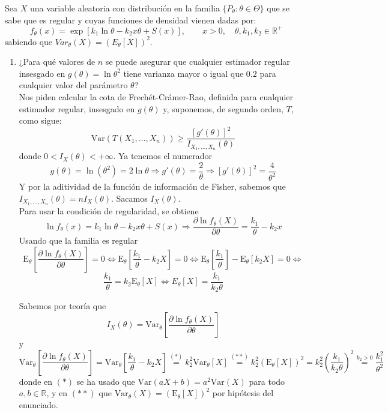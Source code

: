 \documentclass[12pt]{article}
\newcommand{\E}{\mathrm{E}}
\newcommand{\V}{\mathrm{Var}}
\newcommand{\R}{\mathbb{R}}
\begin{document}
    \begin{ejercicio}[2 puntos]
        Sea $X$ una variable aleatoria con distribución en la familia $\{P_\theta:\theta \in \Theta\}$ que se sabe que es regular y cuyas funciones de densidad vienen dadas por:
        \begin{equation*}
            f_\theta(x) = \exp[k_1 \ln\theta - k_2 x \theta + S(x)], \qquad x>0, \quad \theta,k_1,k_2\in \mathbb{R}^+
        \end{equation*}
        sabiendo que $Var_\theta(X) = {(E_\theta[X])}^{2}$.
        \begin{enumerate}[label=\alph*)]
            \item ¿Para qué valores de $n$ se puede asegurar que cualquier estimador regular insesgado en $g(\theta) = \ln\theta^2$ tiene varianza mayor o igual que $0.2$ para cualquier valor del parámetro $\theta$? \\
            
            Nos piden calcular la cota de Frechét-Crámer-Rao, definida para cualquier estimador regular, insesgado en $g(\theta)$ y, suponemos, de segundo orden, $T$, como sigue:
            $$\V(T(X_1, \ldots, X_n)) \geq \dfrac{[g'(\theta)]^2}{I_{X_1, \ldots, X_n}(\theta)}$$
            donde $0 < I_X(\theta) < + \infty$. Ya tenemos el numerador $$g(\theta) = \ln(\theta^2) = 2 \ln \theta \Longrightarrow g'(\theta) = \dfrac{2}{\theta} \Longrightarrow [g'(\theta)]^2 = \dfrac{4}{\theta^2}$$
            Y por la aditividad de la función de información de Fisher, sabemos que $I_{X_1, \ldots, X_n}(\theta) = n I_X(\theta)$. Sacamos $I_{X}(\theta)$. \\

            Para usar la condición de regularidad, se obtiene
            $$\ln f_\theta(x) = k_1 \ln\theta - k_2 x \theta + S(x) \Longrightarrow \dfrac{\partial \ln f_\theta(X)}{\partial \theta} = \dfrac{k_1}{\theta} - k_2 x$$
            Usando que la familia es regular
            $$\E_\theta \left[ \dfrac{\partial \ln f_\theta(X)}{\partial \theta} \right] = 0 \iff 
            \E_\theta \left[ \dfrac{k_1}{\theta} - k_2 X \right] = 0 \iff
            \E_\theta \left[ \dfrac{k_1}{\theta} \right] - \E_\theta [k_2 X] = 0 \iff$$
            $$\dfrac{k_1}{\theta} = k_2 \E_\theta[X] \iff E_\theta[X] = \dfrac{k_1}{k_2 \theta}$$

            Sabemos por teoría que 
            $$I_X(\theta) = \V_\theta \left[ \dfrac{\partial \ln f_\theta(X)}{\partial \theta} \right]$$
            y
            $$\V_\theta \left[ \dfrac{\partial \ln f_\theta(X)}{\partial \theta} \right] = \V_\theta \left[ \dfrac{k_1}{\theta} - k_2 X \right] \stackrel{(*)}{=}
            k_2^2\V_\theta[X] \stackrel{(**)}{=} k_2^2 (\E_\theta[X])^2 = k_2^2 \left( \dfrac{k_1}{k_2 \theta} \right)^2 \stackrel{k_2>0}{=} \dfrac{k_1^2}{\theta^2}$$
            donde en $(*)$ se ha usado que $\V(aX + b) = a^2 \V(X)$ para todo $a,b \in \R$, y en $(**)$ que $\V_\theta(X) = {(\E_\theta[X])}^{2}$ por hipótesis del enunciado.


\end{enumerate}
\end{ejercicio}
\end{document}
